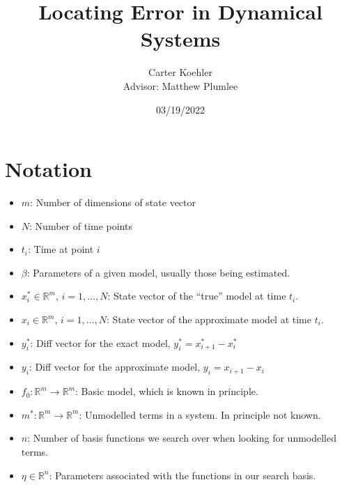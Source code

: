 \documentclass[12pt]{article}
\author{Carter Koehler\\{\small Advisor: Matthew Plumlee}}
\title{Locating Error in Dynamical Systems}
\date{03/19/2022}
\begin{document}
\maketitle



\begin{abstract}
  
\end{abstract}


\section{Notation}

\begin{itemize}

\item
  $m$: Number of dimensions of state vector

\item
  $N$: Number of time points

\item
  $t_i$: Time at point $i$

\item
  $\beta$: Parameters of a given model, usually those being estimated.
  
\item
  $x_i^* \in \mathbb{R}^m,\, i=1,\ldots, N$: State vector of the ``true'' model at time $t_i$. 

\item
  $x_i \in \mathbb{R}^m,\, i=1,\ldots, N$: State vector of the approximate model at time $t_i$. 

\item
  $y_i^*$: Diff vector for the exact model, $y_i^* = x_{i+1}^* - x_i^*$
  
\item
  $y_i$: Diff vector for the approximate model, $y_i = x_{i+1} - x_i$

\item
  $f_0: \mathbb{R}^m \to \mathbb{R}^m$: Basic model, which is known in principle.


\item
  $m^*: \mathbb{R}^m \to \mathbb{R}^m$: Unmodelled terms in a system. In principle not known.
  
\item
  $n$: Number of basis functions we search over when looking for unmodelled terms.
  
\item
  $\eta \in \mathbb{R}^n$: Parameters associated with the functions in our search basis.

\end{itemize}
\end{document}
